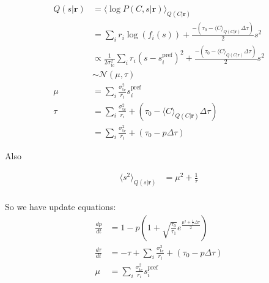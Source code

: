 \documentclass[12pt]{article}
\begin{document}
\begin{equation}
\begin{aligned}
Q(s|\mathbf{r}) &= \langle \log P(C, s|\mathbf{r}) \rangle_{Q(C|\mathbf{r})}\\
&= \sum_i r_i \log(f_i(s)) + \frac{- (\tau_0 - \langle C \rangle_{Q(C|\mathbf{r})} \Delta \tau)}{2} s^2\\
&\propto \frac{1}{2 \sigma^2_{\text{tc}}} \sum_i r_i (s - s_i^{\text{pref}})^2 + \frac{- (\tau_0 - \langle C \rangle_{Q(C|\mathbf{r})} \Delta \tau)}{2} s^2\\
&\sim \mathcal{N} (\mu, \tau)\\
\mu &= \sum_i \frac{\sigma^2_{\text{tc}}}{r_i} s_i^{\text{pref}}\\
\tau &= \sum_i \frac{\sigma^2_{\text{tc}}}{r_i} + (\tau_0 - \langle C \rangle_{Q(C|\mathbf{r})} \Delta \tau)\\
&= \sum_i \frac{\sigma^2_{\text{tc}}}{r_i} + (\tau_0 - p \Delta \tau)
\end{aligned}
\end{equation}

Also

\begin{equation}
\begin{aligned}
\langle s^2 \rangle_{Q(s|\mathbf{r})} &= \mu^2 + \frac{1}{\tau}\\
\end{aligned}
\end{equation}

So we have update equations:
\begin{equation}
\begin{aligned}
\frac{dp}{dt} &= 1 - p(1 + \sqrt{\frac{\tau_0}{\tau_1}} e^{\frac{\mu^2 + \frac{1}{\tau} \Delta \tau}{2}})\\
\frac{d \tau}{dt} &= -\tau + \sum_i \frac{\sigma^2_{\text{tc}}}{r_i} + (\tau_0 - p \Delta \tau)\\
\mu &= \sum_i \frac{\sigma^2_{\text{tc}}}{r_i} s_i^{\text{pref}}\\
\end{aligned}
\end{equation}
\end{document}
